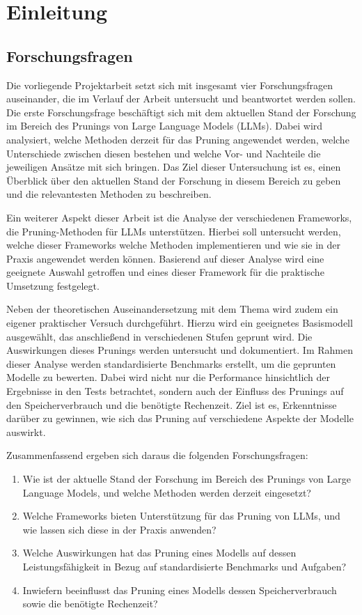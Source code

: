 \section{Einleitung}

\subsection{Forschungsfragen}

Die vorliegende Projektarbeit setzt sich mit insgesamt vier Forschungsfragen
auseinander, die im Verlauf der Arbeit untersucht und beantwortet werden sollen.
Die erste Forschungsfrage beschäftigt sich mit dem aktuellen Stand der Forschung
im Bereich des Prunings von Large Language Models (LLMs). Dabei wird analysiert,
welche Methoden derzeit für das Pruning angewendet werden, welche Unterschiede
zwischen diesen bestehen und welche Vor- und Nachteile die jeweiligen Ansätze
mit sich bringen. Das Ziel dieser Untersuchung ist es, einen Überblick über den
aktuellen Stand der Forschung in diesem Bereich zu geben und die relevantesten
Methoden zu beschreiben.

Ein weiterer Aspekt dieser Arbeit ist die Analyse der verschiedenen Frameworks,
die Pruning-Methoden für LLMs unterstützen. Hierbei soll untersucht werden,
welche dieser Frameworks welche Methoden implementieren und wie sie in der
Praxis angewendet werden können. Basierend auf dieser Analyse wird eine
geeignete Auswahl getroffen und eines dieser Framework für die praktische
Umsetzung festgelegt.

Neben der theoretischen Auseinandersetzung mit dem Thema wird zudem ein eigener
praktischer Versuch durchgeführt. Hierzu wird ein geeignetes Basismodell
ausgewählt, das anschließend in verschiedenen Stufen geprunt wird. Die
Auswirkungen dieses Prunings werden untersucht und dokumentiert. Im Rahmen
dieser Analyse werden standardisierte Benchmarks erstellt, um die geprunten
Modelle zu bewerten. Dabei wird nicht nur die Performance hinsichtlich der
Ergebnisse in den Tests betrachtet, sondern auch der Einfluss des Prunings auf
den Speicherverbrauch und die benötigte Rechenzeit. Ziel ist es, Erkenntnisse
darüber zu gewinnen, wie sich das Pruning auf verschiedene Aspekte der Modelle
auswirkt.

Zusammenfassend ergeben sich daraus die folgenden Forschungsfragen:

\begin{enumerate}
	\item Wie ist der aktuelle Stand der Forschung im Bereich des
	      Prunings von Large Language Models, und welche Methoden werden derzeit
	      eingesetzt?
	\item Welche Frameworks bieten Unterstützung für das Pruning von
	      LLMs, und wie lassen sich diese in der Praxis anwenden?
	\item Welche
	      Auswirkungen hat das Pruning eines Modells auf dessen Leistungsfähigkeit in
	      Bezug auf standardisierte Benchmarks und Aufgaben?
	\item Inwiefern
	      beeinflusst das Pruning eines Modells dessen Speicherverbrauch sowie die
	      benötigte Rechenzeit?
\end{enumerate}
